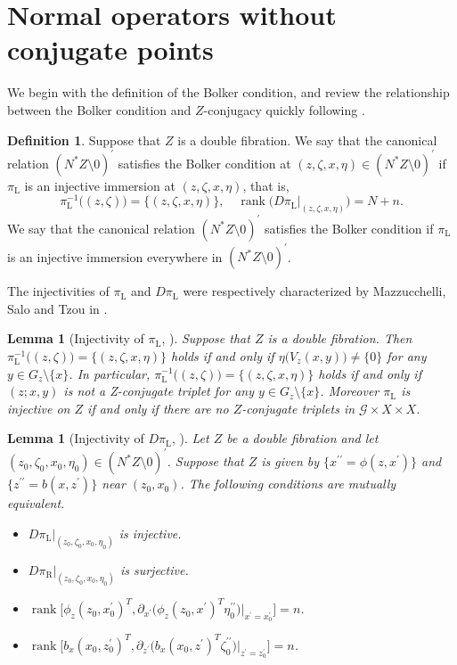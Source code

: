 \documentclass[a4paper,11pt,reqno]{amsart}
\newtheorem{lemma}[theorem]{Lemma}
\theoremstyle{definition}
\newtheorem{definition}[theorem]{Definition}
\theoremstyle{remark}
\begin{document}
\section{Normal operators without conjugate points}
\label{section:bolker}
We begin with the definition of the Bolker condition,  
and review the relationship between the Bolker condition and $Z$-conjugacy quickly 
following \cite{MazzucchelliSaloTzou}. 
%
%
\begin{definition}
\label{theorem:bolker} 
Suppose that $Z$ is a double fibration. 
We say that the canonical relation $(N^\ast{Z}\setminus0)^\prime$ satisfies the Bolker condition at 
$(z,\zeta,x,\eta) \in (N^\ast{Z}\setminus0)^\prime$ 
if $\pi_\text{L}$ is an injective immersion at $(z,\zeta,x,\eta)$, 
that is, 
%
%
$$
\pi_\text{L}^{-1}\bigl((z,\zeta)\bigr)
=
\{(z,\zeta,x,\eta)\},
\quad
\operatorname{rank}
\bigl(D\pi_\text{L}\vert_{(z,\zeta,x,\eta)}\bigr)
=
N+n.
$$
%
%
We say that the canonical relation $(N^\ast{Z}\setminus0)^\prime$ satisfies the Bolker condition if 
$\pi_\text{L}$ is an injective immersion everywhere in $(N^\ast{Z}\setminus0)^\prime$.  
\end{definition}
%
%
The injectivities of $\pi_\text{L}$ and $D\pi_\text{L}$ were respectively characterized by 
Mazzucchelli, Salo and Tzou in \cite{MazzucchelliSaloTzou}. 
%
%
\begin{lemma}[{Injectivity of $\pi_\text{L}$, \cite[{Lemmas~3.1 and 3.2}]{MazzucchelliSaloTzou}}]
\label{theorem:injectivity1} 
Suppose that $Z$ is a double fibration. 
Then $\pi_\text{L}^{-1}\bigl((z,\zeta)\bigr)=\{(z,\zeta,x,\eta)\}$ holds if and only if 
$\eta\bigl(V_z(x,y)\bigr)\ne\{0\}$ for any $y \in G_z\setminus\{x\}$. 
In particular, $\pi_\text{L}^{-1}\bigl((z,\zeta)\bigr)=\{(z,\zeta,x,\eta)\}$ holds if and only if  
$(z;x,y)$ is not a Z-conjugate triplet for any $y \in G_z\setminus\{x\}$. 
Moreover $\pi_\text{L}$ is injective on $Z$ if and only if there are no $Z$-conjugate triplets 
in $\mathcal{G}{\times}X{\times}X$. 
\end{lemma}
%
%
\begin{lemma}[{Injectivity of $D\pi_\text{L}$, \cite[{Lemma~3.3}]{MazzucchelliSaloTzou}}]
\label{theorem:injectivity2} 
Let $Z$ be a double fibration and let $(z_0,\zeta_0,x_0,\eta_0) \in (N^\ast{Z}\setminus0)^\prime$. 
Suppose that $Z$ is given by 
$\{x^{\prime\prime}=\phi(z,x^\prime)\}$ 
and 
$\{z^{\prime\prime}=b(x,z^\prime)\}$ 
near $(z_0,x_0)$. 
The following conditions are mutually equivalent.
%
%
\begin{itemize}
\item[(a)] 
$D\pi_\text{L}\vert_{(z_0,\zeta_0,x_0,\eta_0)}$ is injective. 
\item[(b)] 
$D\pi_\text{R}\vert_{(z_0,\zeta_0,x_0,\eta_0)}$ is surjective.   
\item[(c)] 
$\operatorname{rank}\bigl[\phi_z(z_0,x_0^\prime)^T,\partial_{x^\prime}\bigl(\phi_z(z_0,x^\prime)^T\eta_0^{\prime\prime}\bigr)\vert_{x^\prime=x_0^\prime}\bigr]=n$.  
\item[(d)] 
$\operatorname{rank}\bigl[b_x(x_0,z_0^\prime)^T,\partial_{z^\prime}\bigl(b_x(x_0,z^\prime)^T\zeta_0^{\prime\prime}\bigr)\vert_{z^\prime=z_0^\prime}\bigr]=n$.  
\end{itemize}
%
%
\end{lemma}
\end{document}
